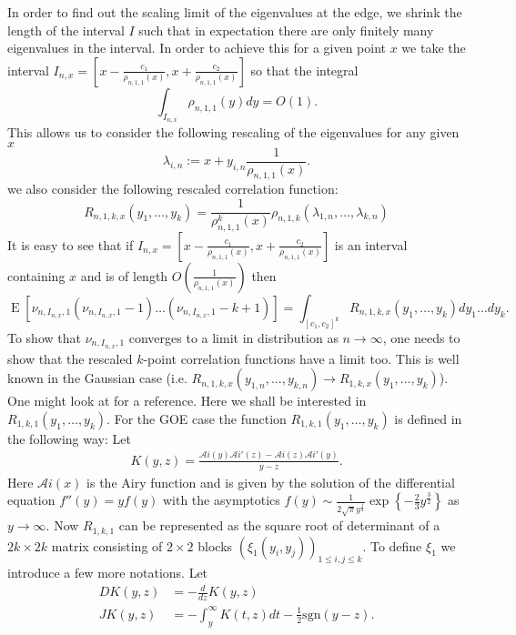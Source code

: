 \documentclass[12pt]{article}
\numberwithin{equation}{section}
\numberwithin{equation}{section}
\theoremstyle{definition}
\DeclareMathOperator{\E}{E} \DeclareMathOperator{\var}{Var}
\renewcommand{\1}{\bf 1}
\begin{document}
\noindent 
In order to find out the scaling limit of the eigenvalues at the edge, we shrink the length of the interval $I$ such that in expectation there are only finitely many eigenvalues in the interval. In order to achieve this for a given point $x$ we take the interval $I_{n,x}= \left[x- \frac{c_{1}}{\rho_{n,1,1}(x)}, x+ \frac{c_{2}}{\rho_{n,1,1}(x)}  \right]$ so that the integral 
\[
\int_{I_{n,x}} \rho_{n,1,1}(y)dy=O(1).
\]
This allows us to consider the following rescaling of the eigenvalues for any given $x$
\[
\lambda_{i,n}:= x+ y_{i,n}\frac{1}{\rho_{n,1,1}(x)}. 
\]
we also consider the following rescaled correlation function:  
\[
R_{n,1,k,x}(y_{1},\ldots, y_{k}) = \frac{1}{\rho^{k}_{n,1,1}(x)}\rho_{n,1,k}\left( \lambda_{1,n},\ldots , \lambda_{k,n} \right)
\]
It is easy to see that if $I_{n,x}= \left[x- \frac{c_{1}}{\rho_{n,1,1}(x)}, x+ \frac{c_{2}}{\rho_{n,1,1}(x)}  \right]$ is an interval containing $x$ and is of length $O\left(\frac{1}{\rho_{n,1,1}(x)}\right)$ then
\[
\E\left[ \nu_{n,I_{n,x},1}\left( \nu_{n,I_{n,x},1} -1\right)\ldots \left( \nu_{n,I_{n,x},1}-k +1 \right) \right]= \int_{[c_{1},c_{2}]^{k}} R_{n,1,k,x}(y_{1},\ldots, y_{k}) dy_{1}\ldots dy_{k}.
\] 
To show that $\nu_{n,I_{n,x},1}$ converges to a limit in distribution as $n \to \infty$, one needs
to show that the rescaled $k$-point correlation functions have a limit too. 
This is well known in the Gaussian case (i.e. $R_{n,1,k,x}(y_{1,n},\ldots, y_{k,n}) \to R_{1,k,x}(y_{1},\ldots, y_{k})  $). One might look at \citet{mehta2004random} for a reference. Here we shall be interested in $R_{1,k,1}(y_{1},\ldots, y_{k})$. For the GOE case the function $R_{1,k,1}(y_{1},\ldots, y_{k})$ is defined in the following way: Let 
\begin{equation}\label{eq:kxy}
\begin{split}
K(y,z)= \frac{\mathcal{A}i(y)\mathcal{A}i'(z)- \mathcal{A}i(z) \mathcal{A}i'(y)}{y-z}.
\end{split}
\end{equation}
Here $\mathcal{A}i(x)$ is the Airy function and is given by the solution of the differential equation $f''(y)=yf(y)$ with the asymptotics $f(y)\sim \frac{1}{2\sqrt{\pi} y^{\frac{1}{4}}}\exp\left\{ -\frac{2}{3} y^{\frac{3}{2}} \right\}$ as $y \to \infty$. 
Now $R_{1,k,1}$ can be represented as the square root of determinant of a $2k \times 2k$ matrix consisting of $2\times 2$ blocks $\left(\xi_{1}(y_{i},y_{j})\right)_{1\le i ,j \le k}$. To define $\xi_{1}$ we introduce a few more notations. Let 
\begin{equation}\label{eq:dk}
\begin{split}
DK(y,z) &= - \frac{d}{dz} K(y,z)\\
JK(y,z) &= - \int_{y}^{\infty} K(t,z)dt - \frac{1}{2} \mathrm{sgn}(y-z).
\end{split}
\end{equation}
\end{document}
